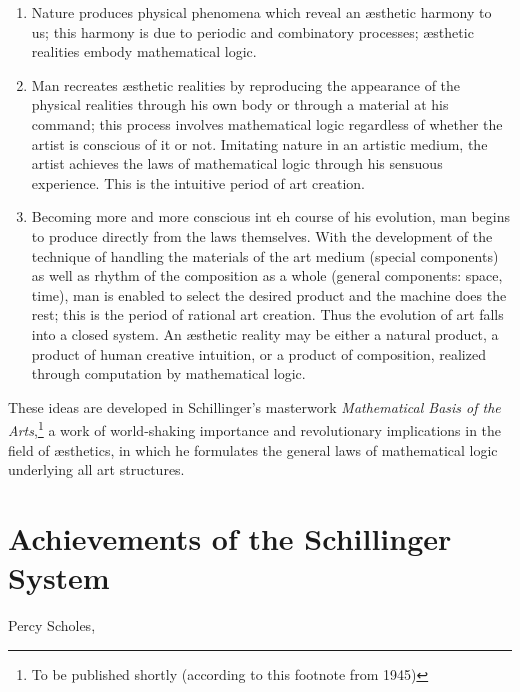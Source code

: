 \begin{enumerate}
	\item Nature produces physical phenomena which reveal an \ae sthetic harmony to us; this harmony is due to periodic and combinatory processes; \ae sthetic realities embody mathematical logic.
	\item Man recreates \ae sthetic realities by reproducing the appearance of the physical realities through his own body or through a material at his command; this process involves mathematical logic regardless of whether the artist is conscious of it or not. Imitating nature in an artistic medium, the artist achieves the laws of mathematical logic through his sensuous experience. This is the intuitive period of art creation.
	\item Becoming more and more conscious int eh course of his evolution,
man begins to produce directly from the laws themselves. With the development
of the technique of handling the materials of the art medium (special
components) as well as rhythm of the composition as a whole (general
components: space, time), man is enabled to select the desired product and the
machine does the rest; this is the period of rational art creation. Thus the
evolution of art falls into a closed system. An \ae sthetic reality may be
either a natural product, a product of human creative intuition, or a product
of composition, realized through computation by mathematical logic.
\end{enumerate}

These ideas are developed in Schillinger's masterwork \textit{Mathematical
Basis of the Arts},\footnote{To be published shortly (according to this
footnote from 1945)} a work of world-shaking importance and revolutionary
implications in the field of \ae sthetics, in which he formulates the general
laws of mathematical logic underlying all art structures.

\section{Achievements of the Schillinger System}

Percy Scholes,
